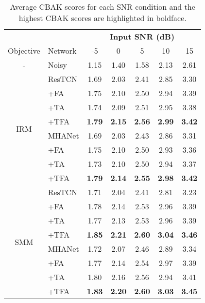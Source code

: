 \begin{table}[!ht]
    \centering
    \scriptsize
    \def\arraystretch{0.99}
    \setlength{\tabcolsep}{5.5pt}
    \caption{Average CBAK scores for each SNR condition and the highest CBAK scores are highlighted in boldface.}
    \label{tab:cbak}
    \begin{tabular}{@{}cl||ccccc@{}}
        \hline
        &  & \multicolumn{5}{c}{\textbf{Input SNR (dB)}}\\  
        \cline{3-7}
        Objective & Network & -5 & 0 & 5 & 10 & 15 \\
        \hline
        - & Noisy & 1.15 & 1.40 & 1.58 & 2.13 & 2.61 \\
        \hline
        \hline
        \multirow{8}{*}{IRM}
        & ResTCN & 1.69 & 2.03 & 2.41 & 2.85 & 3.30 \\
        & +FA    & 1.75 & 2.10 & 2.50 & 2.94 & 3.39 \\
        & +TA    & 1.74 & 2.09 & 2.51 & 2.95 & 3.38 \\
        & +TFA   & \textbf{1.79} & \textbf{2.15} & \textbf{2.56} & \textbf{2.99} & \textbf{3.42} \\
        \cline{2-7}
        & MHANet & 1.69 & 2.03 & 2.43 & 2.86 & 3.31 \\
        & +FA    & 1.75 & 2.10 & 2.50 & 2.93 & 3.36 \\
        & +TA    & 1.73 & 2.10 & 2.50 & 2.94 & 3.37 \\
        & +TFA   & \textbf{1.79} & \textbf{2.14} & \textbf{2.55} & \textbf{2.98} & \textbf{3.42} \\
        \hline
        \hline
        
        \multirow{8}{*}{SMM}
        & ResTCN & 1.71 & 2.04 & 2.41 & 2.81 & 3.23\\
        & +FA    & 1.78 & 2.14 & 2.53 & 2.96 & 3.39\\
        & +TA    & 1.77 & 2.13 & 2.53 & 2.96 & 3.39\\
        & +TFA   & \textbf{1.85} & \textbf{2.21} & \textbf{2.60} & \textbf{3.04} & \textbf{3.46} \\
        \cline{2-7}
        & MHANet & 1.72 & 2.07 & 2.46 & 2.89 & 3.34 \\
        & +FA    & 1.77 & 2.14 & 2.54 & 2.97 & 3.39 \\
        & +TA    & 1.80 & 2.16 & 2.56 & 2.94 & 3.41\\
        & +TFA   & \textbf{1.83} & \textbf{2.20} & \textbf{2.60} & \textbf{3.03} & \textbf{3.45} \\
        \hline
        \hline
        

\end{tabular}
\end{table}
